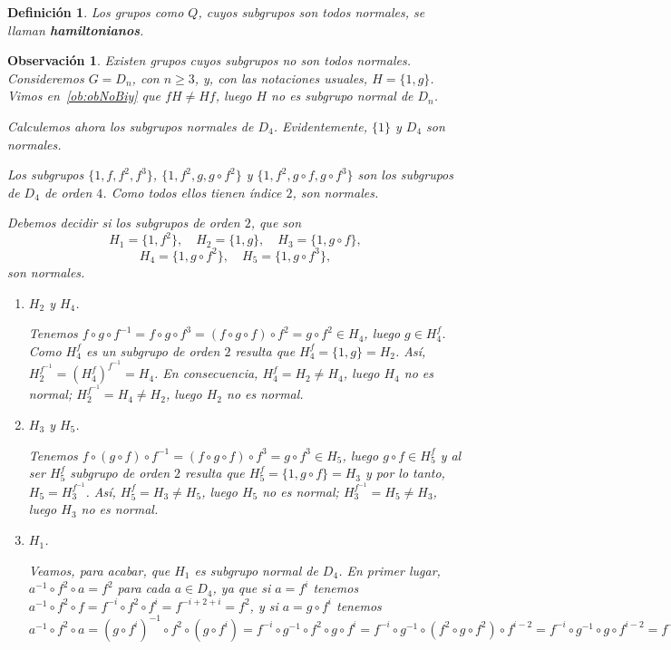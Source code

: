 \documentclass[12pt]{article}
\newtheorem{definition}[theorem]{Definición}
\newtheorem{observation}{Observación}[theorem]
\begin{document}
\begin{definition}Los grupos como $Q$, cuyos subgrupos son todos normales, se llaman \textbf{hamiltonianos}.
\end{definition}

\begin{observation}\label{ob:gruNNo} Existen grupos cuyos subgrupos no son todos normales. Consideremos $G = D_n$, con $n \geq 3$, y, con las notaciones usuales, $H = \lbrace 1, g\rbrace$. Vimos en~\ref{ob:obNoBiy} que $fH \neq Hf$, luego $H$ no es subgrupo normal de $D_n$.

Calculemos ahora los subgrupos normales de $D_4$. Evidentemente, $\lbrace 1 \rbrace$ y $D_4$ son normales.

Los subgrupos $\lbrace 1, f, f^2, f^3 \rbrace$, $\lbrace 1,f^2, g, g \circ f^2 \rbrace$ y $\lbrace 1,f^2, g \circ f, g \circ f^3 \rbrace$ son los subgrupos de $D_4$ de orden $4$. Como todos ellos tienen índice $2$, son normales.

Debemos decidir si los subgrupos de orden $2$, que son $$H_1 = \lbrace 1,f^2 \rbrace, \quad H_2 = \lbrace 1,g \rbrace, \quad H_3 = \lbrace 1, g \circ f \rbrace,$$ $$H_4 = \lbrace 1, g \circ f^2 \rbrace, \quad H_5 = \lbrace 1, g \circ f^3 \rbrace,$$ son normales.

\begin{enumerate}
\item $H_2$ y $H_4$.

Tenemos $f \circ g \circ f^{-1} = f \circ g \circ f^3 = (f \circ g \circ f) \circ f^2 = g \circ f^2 \in H_4$, luego $g \in H^f_4$. Como $H^f_4$ es un subgrupo de orden $2$ resulta que $H^f_4 = \lbrace 1,g \rbrace = H_2$. Así, $H_2^{f^{-1}} = (H^f_4)^{f^{-1}} = H_4$. En consecuencia, $H^f_4 = H_2 \neq H_4$, luego $H_4$ no es normal; $H^{f^{-1}}_2 = H_4 \neq H_2$, luego $H_2$ no es normal.
\item $H_3$ y $H_5$.

Tenemos $f \circ (g \circ f) \circ f^{-1} = (f \circ g \circ f) \circ f^3 = g \circ f^3 \in H_5$, luego $g \circ f \in H_5^f$ y al ser $H_5^f$ subgrupo de orden $2$ resulta que $H_5^f = \lbrace 1, g \circ f \rbrace = H_3$ y por lo tanto, $H_5 = H_3^{f^{-1}}$. Así, $H_5^f = H_3 \neq H_5$, luego $H_5$ no es normal; $H_3^{f^{-1}} = H_5 \neq H_3$, luego $H_3$ no es normal.

\item $H_1$.

Veamos, para acabar, que $H_1$ es subgrupo normal de $D_4$. En primer lugar, $a^{-1} \circ f^2 \circ a = f^2$ para cada $a \in D_4$, ya que si $a = f^i$ tenemos $a^{-1} \circ f^2 \circ f = f^{-i} \circ f^2 \circ f^i = f^{-i+2+i} = f^2$, y si $a = g \circ f^i$ tenemos $a^{-1} \circ f^2 \circ a = (g \circ f^i)^{-1} \circ f^2 \circ (g \circ f^i) = f^{-i} \circ g^{-1} \circ f^2 \circ g \circ f^i = f^{-i} \circ g^{-1} \circ (f^2 \circ g \circ f^2) \circ f^{i-2} = f^{-i} \circ g^{-1} \circ g \circ f^{i-2} = f^{-i} \circ f^{i-2} = f^{-2} = f^2.$


\end{enumerate}
\end{observation}
\end{document}
